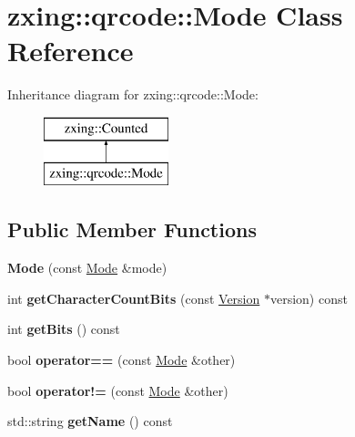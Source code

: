 \hypertarget{classzxing_1_1qrcode_1_1_mode}{}\section{zxing\+:\+:qrcode\+:\+:Mode Class Reference}
\label{classzxing_1_1qrcode_1_1_mode}
Inheritance diagram for zxing\+:\+:qrcode\+:\+:Mode\+:\begin{figure}[H]
\begin{center}
\leavevmode
\includegraphics[height=2.000000cm]{classzxing_1_1qrcode_1_1_mode}
\end{center}
\end{figure}
\subsection*{Public Member Functions}
\begin{DoxyCompactItemize}
\item 
\mbox{\label{classzxing_1_1qrcode_1_1_mode_aa57e0da92d2ca3132319eb5348dbbf54}} 
{\bfseries Mode} (const \mbox{\hyperlink{classzxing_1_1qrcode_1_1_mode}{Mode}} \&mode)
\item 
\mbox{\label{classzxing_1_1qrcode_1_1_mode_afd7e27b831d8b79fc231de97d6eaff79}} 
int {\bfseries get\+Character\+Count\+Bits} (const \mbox{\hyperlink{classzxing_1_1qrcode_1_1_version}{Version}} $\ast$version) const
\item 
\mbox{\label{classzxing_1_1qrcode_1_1_mode_a27877247bf96e3660001d72c72644d47}} 
int {\bfseries get\+Bits} () const
\item 
\mbox{\label{classzxing_1_1qrcode_1_1_mode_a1573caa38a667d1ea2784d2b02371fb1}} 
bool {\bfseries operator==} (const \mbox{\hyperlink{classzxing_1_1qrcode_1_1_mode}{Mode}} \&other)
\item 
\mbox{\label{classzxing_1_1qrcode_1_1_mode_af1549e594f22c19720afbfa907e9f633}} 
bool {\bfseries operator!=} (const \mbox{\hyperlink{classzxing_1_1qrcode_1_1_mode}{Mode}} \&other)
\item 
\mbox{\label{classzxing_1_1qrcode_1_1_mode_a842c3e2fd59b6c904c1435d95fb7d010}} 
std\+::string {\bfseries get\+Name} () const
\end{DoxyCompactItemize}
